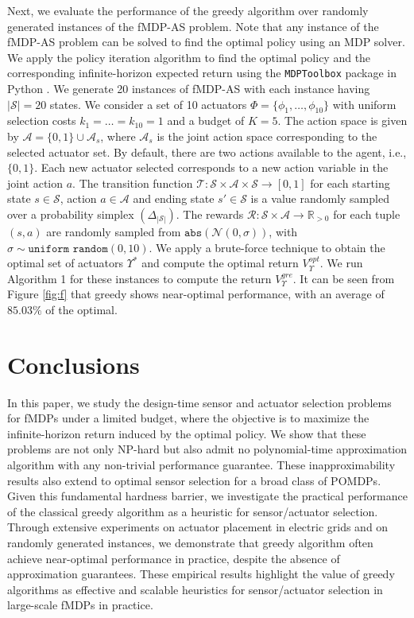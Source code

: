 \documentclass[twocolumn]{autart}    %
\begin{document}
Next, we evaluate the performance of the greedy algorithm over randomly generated instances of the fMDP-AS problem. Note that any instance of the fMDP-AS problem can be solved to find the optimal policy using an MDP solver. We apply the policy iteration algorithm to find the optimal policy and the corresponding infinite-horizon expected return using the \texttt{MDPToolbox} package in Python \cite{mdpsolver}. We generate 20 instances of fMDP-AS with each instance having $|\mathcal{S}| = 20$ states. We consider a set of 10 actuators $\Phi = \{\phi_1, \hdots, \phi_{10}\}$ with uniform selection costs $ k_1 = \hdots = k_{10} = 1$ and a budget of $K = 5$. The action space is given by $\mathcal{A} = \{0,1\} \cup \mathcal{A}_s$, where $\mathcal{A}_s$ is the joint action space corresponding to the selected actuator set. By default, there are two actions available to the agent, i.e., $\{0,1\}$. Each new actuator selected corresponds to a new action variable in the joint action $a$. The transition function $\mathcal{T}: \mathcal{S} \times \mathcal{A} \times \mathcal{S} \rightarrow [0,1] $ for each starting state  $s \in \mathcal{S} $, action $a \in \mathcal{A} $ and ending state  $s' \in \mathcal{S} $ is a value randomly sampled  over a probability simplex $(\Delta_{|\mathcal{S}|})$. The rewards $\mathcal{R}: \mathcal{S} \times \mathcal{A} \rightarrow \mathbb{R}_{>0} $ for each tuple $(s,a)$ are randomly sampled from $\texttt{abs}(\mathcal{N}(0,\sigma))$, with $\sigma \sim \texttt{uniform random} (0,10)$. We apply a brute-force technique to obtain the optimal set of actuators $\Upsilon^*$ and compute the optimal return $V_\Upsilon^{opt}$. We run Algorithm 1 for these instances to compute the return $V_\Upsilon^{gre}$. It can be seen from Figure \ref{fig:f} that greedy shows near-optimal performance, with an average of $85.03\%$ of the optimal.  


\section{Conclusions}

In this paper, we study the design-time sensor and actuator selection problems for  fMDPs under a limited budget, where the objective is to maximize the infinite-horizon return induced by the optimal policy. We show that these problems are not only NP-hard but also admit no polynomial-time approximation algorithm with any non-trivial performance guarantee. These inapproximability results also extend to optimal sensor selection for a broad class of POMDPs. Given this fundamental hardness barrier, we investigate the practical performance of the classical greedy algorithm as a heuristic for sensor/actuator selection. Through extensive experiments on actuator placement in electric grids and on randomly generated instances, we demonstrate that greedy algorithm often achieve near-optimal performance in practice, despite the absence of approximation guarantees. These empirical results highlight the value of greedy algorithms as effective and scalable heuristics for sensor/actuator selection in large-scale fMDPs in practice.
 
\end{document}
